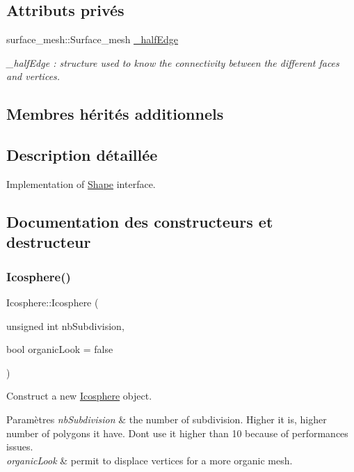 \subsection*{Attributs privés}
\begin{DoxyCompactItemize}
\item 
surface\+\_\+mesh\+::\+Surface\+\_\+mesh \hyperlink{class_icosphere_a454cb570544ec34a65e2f3753fd3dc14}{\+\_\+half\+Edge}
\begin{DoxyCompactList}\small\item\em \+\_\+half\+Edge \+: structure used to know the connectivity between the different faces and vertices. \end{DoxyCompactList}\end{DoxyCompactItemize}
\subsection*{Membres hérités additionnels}


\subsection{Description détaillée}
Implementation of \hyperlink{class_shape}{Shape} interface. 

\subsection{Documentation des constructeurs et destructeur}
\mbox{\label{class_icosphere_a6051bb79f73f5aecb95074118fb019b3}} 
\subsubsection{\texorpdfstring{Icosphere()}{Icosphere()}}
{\footnotesize\ttfamily Icosphere\+::\+Icosphere (\begin{DoxyParamCaption}\item[{unsigned int}]{nb\+Subdivision,  }\item[{bool}]{organic\+Look = {\ttfamily false} }\end{DoxyParamCaption})}



Construct a new \hyperlink{class_icosphere}{Icosphere} object. 


\begin{DoxyParams}{Paramètres}
{\em nb\+Subdivision} & the number of subdivision. Higher it is, higher number of polygons it have. Don\textquotesingle{}t use it higher than 10 because of performances issues. \\
\hline
{\em organic\+Look} & permit to displace vertices for a more organic mesh. \\
\hline
\end{DoxyParams}
\mbox{\label{class_icosphere_ac9473c8c8d6085b6370d95772b898a45}} 
